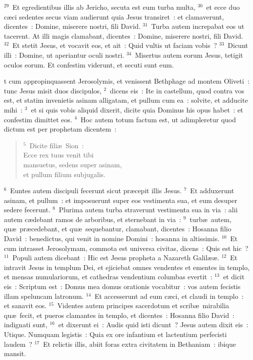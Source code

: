 ${}^{29}$~Et egredientibus illis ab Jericho, secuta est eum turba multa,
${}^{30}$~et ecce duo c\ae ci sedentes secus viam audierunt quia Jesus transiret~: et clamaverunt, dicentes~: Domine, miserere nostri, fili David.
${}^{31}$~Turba autem increpabat eos ut tacerent. At illi magis clamabant, dicentes~: Domine, miserere nostri, fili David.
${}^{32}$~Et stetit Jesus, et vocavit eos, et ait~: Quid vultis ut faciam vobis~?
${}^{33}$~Dicunt illi~: Domine, ut aperiantur oculi nostri.
${}^{34}$~Misertus autem eorum Jesus, tetigit oculos eorum. Et confestim viderunt, et secuti sunt eum.

\bchapter
{}t cum appropinquassent Jerosolymis, et venissent Bethphage ad montem Oliveti~: tunc Jesus misit duos discipulos,
${}^{2}$~dicens eis~: Ite in castellum, quod contra vos est, et statim invenietis asinam alligatam, et pullum cum ea~: solvite, et adducite mihi~:
${}^{3}$~et si quis vobis aliquid dixerit, dicite quia Dominus his opus habet~: et confestim dimittet eos.
${}^{4}$~Hoc autem totum factum est, ut adimpleretur quod dictum est per prophetam dicentem~:
\begin{verse}${}^{5}$~Dicite fili\ae\ Sion~:\\ Ecce rex tuus venit tibi\\ mansuetus, sedens super asinam,\\ et pullum filium subjugalis.\end{verse}


${}^{6}$~Euntes autem discipuli fecerunt sicut pr\ae cepit illis Jesus.
${}^{7}$~Et adduxerunt asinam, et pullum~: et imposuerunt super eos vestimenta sua, et eum desuper sedere fecerunt.
${}^{8}$~Plurima autem turba straverunt vestimenta sua in via~: alii autem c\ae debant ramos de arboribus, et sternebant in via~:
${}^{9}$~turb\ae\ autem, qu\ae\ pr\ae cedebant, et qu\ae\ sequebantur, clamabant, dicentes~: Hosanna filio David~: benedictus, qui venit in nomine Domini~: hosanna in altissimis.
${}^{10}$~Et cum intrasset Jerosolymam, commota est universa civitas, dicens~: Quis est hic~?
${}^{11}$~Populi autem dicebant~: Hic est Jesus propheta a Nazareth Galil\ae \ae .
${}^{12}$~Et intravit Jesus in templum Dei, et ejiciebat omnes vendentes et ementes in templo, et mensas numulariorum, et cathedras vendentium columbas evertit~:
${}^{13}$~et dicit eis~: Scriptum est~: Domus mea domus orationis vocabitur~: vos autem fecistis illam speluncam latronum.
${}^{14}$~Et accesserunt ad eum c\ae ci, et claudi in templo~: et sanavit eos.
${}^{15}$~Videntes autem principes sacerdotum et scrib\ae\ mirabilia qu\ae\ fecit, et pueros clamantes in templo, et dicentes~: Hosanna filio David~: indignati sunt,
${}^{16}$~et dixerunt ei~: Audis quid isti dicunt~? Jesus autem dixit eis~: Utique. Numquam legistis~: Quia ex ore infantium et lactentium perfecisti laudem~?
${}^{17}$~Et relictis illis, abiit foras extra civitatem in Bethaniam~: ibique mansit.


